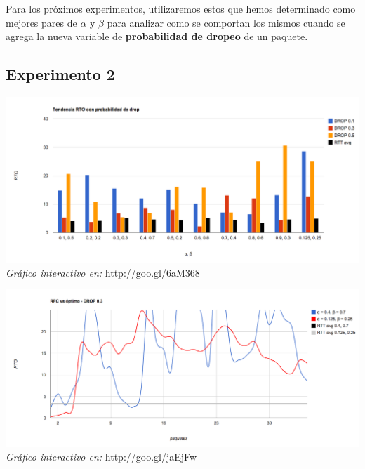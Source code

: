 Para los próximos experimentos, utilizaremos estos que hemos determinado como mejores pares de $\alpha$ y $\beta$ para analizar como se comportan los mismos cuando se agrega la nueva variable de \textbf{probabilidad de dropeo} de un paquete.

\subsection{Experimento 2}

\begin{center}
	\includegraphics[scale=0.35]{graphics/tendencia_RTO_drop.png}
	\textit{Gráfico interactivo en:} http://goo.gl/6aM368
\end{center}

\begin{center}
	\includegraphics[scale=0.35]{graphics/rfc_vs_optimo.png}
	\textit{Gráfico interactivo en:} http://goo.gl/jaEjFw
\end{center}
